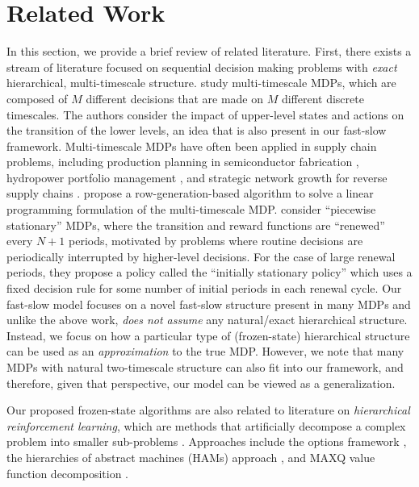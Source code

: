 \documentclass[11pt, notitlepage]{article}
\newcommand{\1}{\mathbbm{1}}
\begin{document}
    


\section{Related Work}

 In this section, we provide a brief review of related literature. 
First, there exists a stream of literature focused on sequential decision making problems with \emph{exact} hierarchical, multi-timescale structure.
\citet{chang2003multitime} study multi-timescale MDPs, which are composed of $M$ different decisions that are made on $M$ different discrete timescales. The authors consider the impact of upper-level states and actions on the transition of the lower levels, an idea that is also present in our fast-slow framework. Multi-timescale MDPs have often been applied in supply chain problems, including production planning in semiconductor fabrication \citep{panigrahi2004hierarchical, bhatnagar2006actor}, hydropower portfolio management \citep{zhu2006hydropower}, and strategic network growth for reverse supply chains \citep{wongthatsanekorn2010multi}.
\citet{wang2018demand} propose a row-generation-based algorithm to solve a linear programming formulation of the multi-timescale MDP. 
\citet{jacobson1999piecewise} consider ``piecewise stationary'' MDPs, where the transition and reward functions are ``renewed'' every $N+1$ periods, motivated by problems where routine decisions are periodically interrupted by higher-level decisions. For the case of large renewal periods, they propose a policy called the ``initially stationary policy'' which uses a fixed decision rule for some number of initial periods in each renewal cycle. 
Our fast-slow model focuses on a novel fast-slow structure present in many MDPs and unlike the above work, \emph{does not assume} any natural/exact hierarchical structure. Instead, we focus on how a particular type of (frozen-state) hierarchical structure can be used as an \emph{approximation} to the true MDP. However, we note that many MDPs with natural two-timescale structure can also fit into our framework, and therefore, given that perspective, our model can be viewed as a generalization.



Our proposed frozen-state algorithms are also related to literature on \emph{hierarchical reinforcement learning}, which are methods that artificially decompose a complex problem into smaller sub-problems \citep{barto2003recent}. 
Approaches include the options framework \citep{sutton1999between}, the hierarchies of abstract machines (HAMs) approach \citep{parr1998hierarchical}, and MAXQ value function decomposition \citep{dietterich2000hierarchical}. 
 
\end{document}
